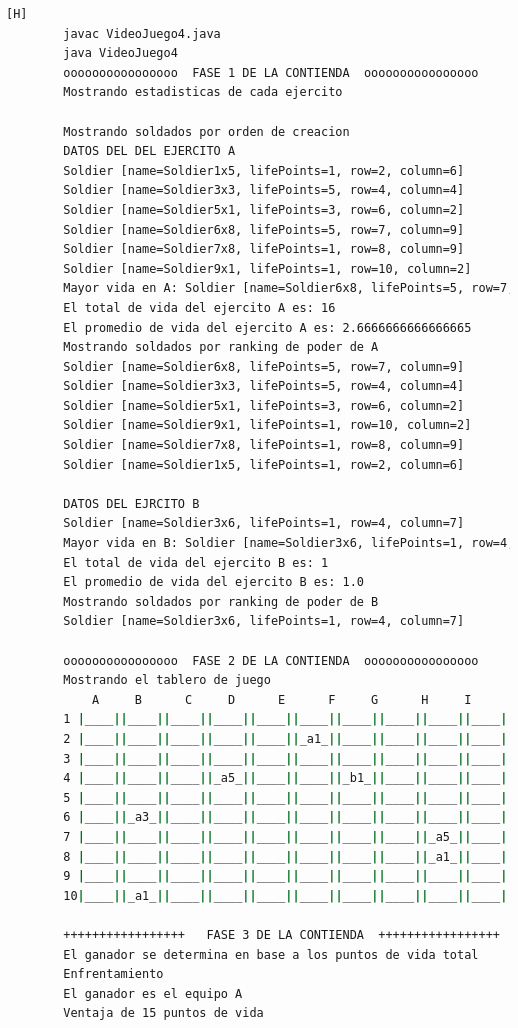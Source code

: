 \documentclass{article}
\begin{document}
	\begin{lstlisting}[language=bash,caption={Compilando y probando el tablero  }][H]
		javac VideoJuego4.java
		java VideoJuego4
		oooooooooooooooo  FASE 1 DE LA CONTIENDA  oooooooooooooooo
		Mostrando estadisticas de cada ejercito
		
		Mostrando soldados por orden de creacion
		DATOS DEL DEL EJERCITO A
		Soldier [name=Soldier1x5, lifePoints=1, row=2, column=6]
		Soldier [name=Soldier3x3, lifePoints=5, row=4, column=4]
		Soldier [name=Soldier5x1, lifePoints=3, row=6, column=2]
		Soldier [name=Soldier6x8, lifePoints=5, row=7, column=9]
		Soldier [name=Soldier7x8, lifePoints=1, row=8, column=9]
		Soldier [name=Soldier9x1, lifePoints=1, row=10, column=2]
		Mayor vida en A: Soldier [name=Soldier6x8, lifePoints=5, row=7, column=9]
		El total de vida del ejercito A es: 16
		El promedio de vida del ejercito A es: 2.6666666666666665
		Mostrando soldados por ranking de poder de A
		Soldier [name=Soldier6x8, lifePoints=5, row=7, column=9]
		Soldier [name=Soldier3x3, lifePoints=5, row=4, column=4]
		Soldier [name=Soldier5x1, lifePoints=3, row=6, column=2]
		Soldier [name=Soldier9x1, lifePoints=1, row=10, column=2]
		Soldier [name=Soldier7x8, lifePoints=1, row=8, column=9]
		Soldier [name=Soldier1x5, lifePoints=1, row=2, column=6]
		
		DATOS DEL EJRCITO B
		Soldier [name=Soldier3x6, lifePoints=1, row=4, column=7]
		Mayor vida en B: Soldier [name=Soldier3x6, lifePoints=1, row=4, column=7]
		El total de vida del ejercito B es: 1
		El promedio de vida del ejercito B es: 1.0
		Mostrando soldados por ranking de poder de B
		Soldier [name=Soldier3x6, lifePoints=1, row=4, column=7]
		
		oooooooooooooooo  FASE 2 DE LA CONTIENDA  oooooooooooooooo
		Mostrando el tablero de juego
		    A     B      C     D      E      F     G      H     I      J
		1 |____||____||____||____||____||____||____||____||____||____|
		2 |____||____||____||____||____||_a1_||____||____||____||____|
		3 |____||____||____||____||____||____||____||____||____||____|
		4 |____||____||____||_a5_||____||____||_b1_||____||____||____|
		5 |____||____||____||____||____||____||____||____||____||____|
		6 |____||_a3_||____||____||____||____||____||____||____||____|
		7 |____||____||____||____||____||____||____||____||_a5_||____|
		8 |____||____||____||____||____||____||____||____||_a1_||____|
		9 |____||____||____||____||____||____||____||____||____||____|
		10|____||_a1_||____||____||____||____||____||____||____||____|
		
		+++++++++++++++++   FASE 3 DE LA CONTIENDA  +++++++++++++++++
		El ganador se determina en base a los puntos de vida total
		Enfrentamiento
		El ganador es el equipo A
		Ventaja de 15 puntos de vida
	\end{lstlisting}
	
\end{document}
